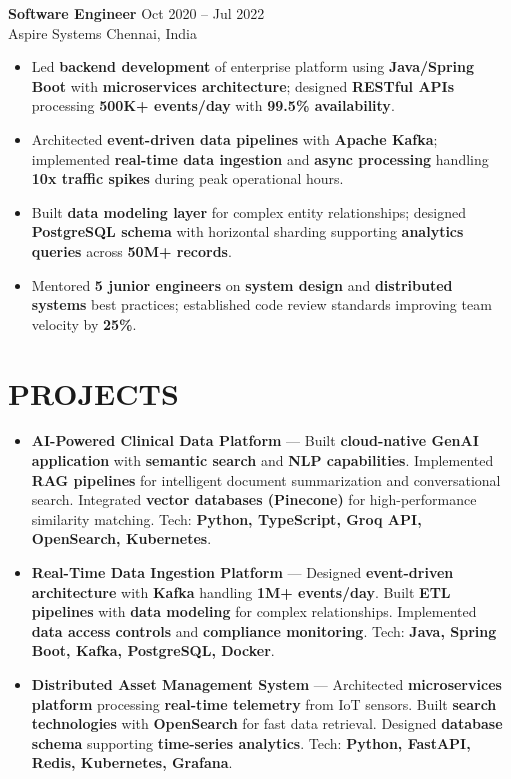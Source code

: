 \documentclass[letterpaper,10pt]{article}
\newcommand{\resumeItem}[1]{\item\small #1}
\newcommand{\resumeSubheading}[4]{
  \vspace{6pt}
  \noindent
  \textbf{#1} \hfill {\footnotesize #2} \\
  [-1pt]
  \noindent
  \small #3 \hfill {\small #4}
  \vspace{3pt}
}
\newcommand{\resumeItemsStart}{\vspace{-2pt}\begin{itemize}}
\newcommand{\resumeItemsEnd}{\end{itemize}\vspace{6pt}}
\begin{document}
\resumeSubheading
{Software Engineer}{Oct 2020 -- Jul 2022}
{Aspire Systems}{Chennai, India}
\resumeItemsStart
\resumeItem{Led \textbf{backend development} of enterprise platform using \textbf{Java/Spring Boot} with \textbf{microservices architecture}; designed \textbf{RESTful APIs} processing \textbf{500K+ events/day} with \textbf{99.5\% availability}.}
\resumeItem{Architected \textbf{event-driven data pipelines} with \textbf{Apache Kafka}; implemented \textbf{real-time data ingestion} and \textbf{async processing} handling \textbf{10x traffic spikes} during peak operational hours.}
\resumeItem{Built \textbf{data modeling layer} for complex entity relationships; designed \textbf{PostgreSQL schema} with horizontal sharding supporting \textbf{analytics queries} across \textbf{50M+ records}.}
\resumeItem{Mentored \textbf{5 junior engineers} on \textbf{system design} and \textbf{distributed systems} best practices; established code review standards improving team velocity by \textbf{25\%}.}
\resumeItemsEnd
\vspace{-8pt}


\section{\textcolor{metablue}{PROJECTS}}
\vspace{-5pt}
\begin{tcolorbox}[colback=white,colframe=metablue,boxrule=0.8pt,arc=2pt,left=4pt,right=4pt,top=2pt,bottom=2pt]
\begin{itemize}
\resumeItem{\textbf{AI-Powered Clinical Data Platform} --- Built \textbf{cloud-native GenAI application} with \textbf{semantic search} and \textbf{NLP capabilities}. Implemented \textbf{RAG pipelines} for intelligent document summarization and conversational search. Integrated \textbf{vector databases (Pinecone)} for high-performance similarity matching. Tech: \textbf{Python, TypeScript, Groq API, OpenSearch, Kubernetes}.}

\resumeItem{\textbf{Real-Time Data Ingestion Platform} --- Designed \textbf{event-driven architecture} with \textbf{Kafka} handling \textbf{1M+ events/day}. Built \textbf{ETL pipelines} with \textbf{data modeling} for complex relationships. Implemented \textbf{data access controls} and \textbf{compliance monitoring}. Tech: \textbf{Java, Spring Boot, Kafka, PostgreSQL, Docker}.}

\resumeItem{\textbf{Distributed Asset Management System} --- Architected \textbf{microservices platform} processing \textbf{real-time telemetry} from IoT sensors. Built \textbf{search technologies} with \textbf{OpenSearch} for fast data retrieval. Designed \textbf{database schema} supporting \textbf{time-series analytics}. Tech: \textbf{Python, FastAPI, Redis, Kubernetes, Grafana}.}

\end{itemize}
\end{tcolorbox}
\vspace{-5pt}
\end{document}
